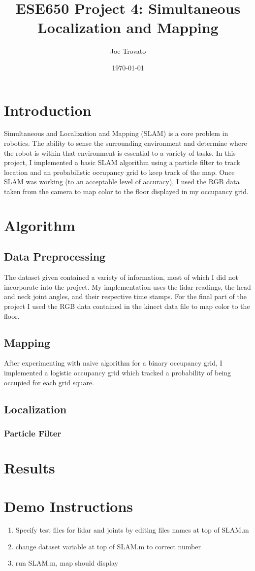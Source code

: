 \documentclass{article}
\begin{document}
\title{ESE650 Project 4: Simultaneous Localization and Mapping}
\author{Joe Trovato}
\date{\today}
\maketitle
\setlength{\parindent}{10ex}

\section{Introduction}
Simultaneous and Localization and Mapping (SLAM) is a core problem in robotics. The ability to sense the surrounding environment and determine where the robot is within that environment is essential to a variety of tasks. In this project, I implemented a basic SLAM algorithm using a particle filter to track location and an probabilistic occupancy grid to keep track of the map. Once SLAM was working (to an acceptable level of accuracy), I used the RGB data taken from the camera to map color to the floor displayed in my occupancy grid. 


\section{Algorithm}
\subsection{Data Preprocessing}
The dataset given contained a variety of information, most of which  I did not incorporate into the project. My implementation uses the lidar readings, the head and neck joint angles, and their respective time stamps. For the final part of the project I used the RGB data contained in the kinect data file to map color to the floor. 
 
\subsection{Mapping}
After experimenting with naive algorithm for a binary occupancy grid, I implemented a logistic occupancy grid which tracked a probability of being occupied for each grid square. 

\subsection{Localization}
\subsubsection{Particle Filter}

\section{Results}


\section{Demo Instructions}
\begin{enumerate}
	\item Specify test files for lidar and joints by editing files names at top of SLAM.m
	\item change dataset variable at top of SLAM.m to correct number
	\item run SLAM.m, map should display

\end{enumerate}
\end{document}

